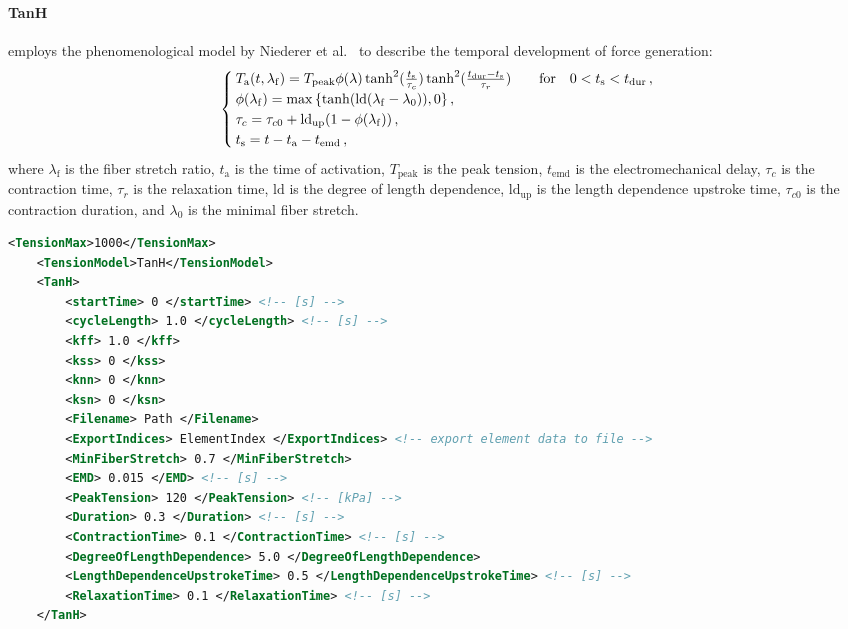 \paragraph{TanH} employs the phenomenological model by Niederer et al.~\cite{Niederer-2011-ID16420} to describe the temporal development of force generation:
\begin{equation}
\begin{cases}
    T_\text{a}(t,\lambda_\mathrm{f}) = T_\text{peak} \phi (\lambda) \tanh^2(\frac{t_\text{s}}{\tau_c}) \tanh^2(\frac{t_\text{dur} - t_\text{s}}{\tau_r}) & \qfor 0 < t_\text{s} < t_\text{dur} \,, \\
    \phi(\lambda_\mathrm{f}) = \max\qty{\tanh(\text{ld}(\lambda_\mathrm{f} - \lambda_0)),0}\,, & \\
    \tau_c = \tau_{c0} + \text{ld}_\text{up} (1 - \phi(\lambda_\mathrm{f}))\,, & \\
    t_\text{s} = t - t_\text{a} - t_\text{emd}\,, & \\
\end{cases} \label{eq:TanH}
\end{equation}
where $\lambda_\mathrm{f}$ is the fiber stretch ratio, $t_\text{a}$ is the time of activation, $T_\text{peak}$ is the peak tension, $t_\text{emd}$ is the electromechanical delay, $\tau_c$ is the contraction time, $\tau_r$ is the relaxation time, $\text{ld}$ is the degree of length dependence, $\text{ld}_\text{up}$ is the length dependence upstroke time, $\tau_{c0}$ is the contraction duration, and $\lambda_0$ is the minimal fiber stretch.

\begin{lstlisting}[language=XML,caption=.xml settings for the TanH tension model]
    <TensionMax>1000</TensionMax>
    <TensionModel>TanH</TensionModel>
    <TanH>
        <startTime> 0 </startTime> <!-- [s] -->
        <cycleLength> 1.0 </cycleLength> <!-- [s] -->
        <kff> 1.0 </kff>
        <kss> 0 </kss>
        <knn> 0 </knn>
        <ksn> 0 </ksn>
        <Filename> Path </Filename>
        <ExportIndices> ElementIndex </ExportIndices> <!-- export element data to file -->
        <MinFiberStretch> 0.7 </MinFiberStretch> 
        <EMD> 0.015 </EMD> <!-- [s] -->
        <PeakTension> 120 </PeakTension> <!-- [kPa] -->
        <Duration> 0.3 </Duration> <!-- [s] -->
        <ContractionTime> 0.1 </ContractionTime> <!-- [s] -->
        <DegreeOfLengthDependence> 5.0 </DegreeOfLengthDependence> 
        <LengthDependenceUpstrokeTime> 0.5 </LengthDependenceUpstrokeTime> <!-- [s] -->
        <RelaxationTime> 0.1 </RelaxationTime> <!-- [s] -->
    </TanH>
\end{lstlisting}

